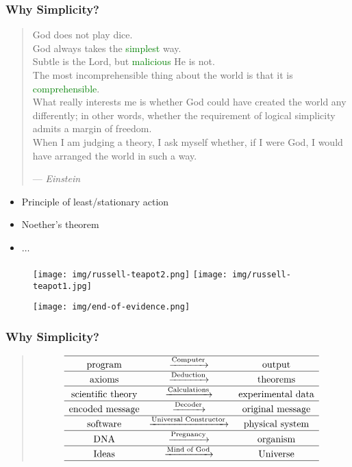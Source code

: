 \documentclass[UTF8,11pt,colorlinks,compress,openany]{beamer}%
\begin{document}
\begin{frame}\frametitle{Why Simplicity?}
	\begin{quote}
		God does not play dice.\\
		God always takes the \textcolor{green}{simplest} way.\\
		Subtle is the Lord, but \textcolor{green}{malicious} He is not.\\
		The most incomprehensible thing about the world is that it is \textcolor{green}{comprehensible}.\\
		What really interests me is whether God could have created the world any differently; in other words, whether the requirement of logical simplicity admits a margin of freedom.\\
		When I am judging a theory, I ask myself whether, if I were God, I would have arranged the
		world in such a way. \par\hfill --- \textsl{Einstein}
	\end{quote}
	\begin{itemize}
		\item Principle of least/stationary action
		\item Noether's theorem
		\item $\dots$
	\end{itemize}
\end{frame}

\begin{frame}\frametitle{}
\begin{figure}[H]
\texttt{[image: img/russell-teapot2.png]}
\texttt{[image: img/russell-teapot1.jpg]}
\end{figure}
\begin{figure}[H]
\texttt{[image: img/end-of-evidence.png]}
\end{figure}
\end{frame}

\begin{frame}\frametitle{Why Simplicity?}
	\begin{quote}
		\[\begin{array}{ccccc}
		\hline
		\text{program} & \xrightarrow{\text{Computer}} & \text{output}\\
		\hline
		\text{axioms} & \xrightarrow{\text{Deduction}} & \text{theorems}\\
		\hline
		\text{scientific theory} & \xrightarrow{\text{Calculations}} & \text{experimental data}\\
		\hline
		\text{encoded message} & \xrightarrow{\text{Decoder}} & \text{original message}\\
		\hline
		\text{software} & \xrightarrow{\text{Universal Constructor}} & \text{physical system}\\
		\hline
		\text{DNA} & \xrightarrow{\text{Pregnancy}} & \text{organism}\\
		\hline
		\text{Ideas} & \xrightarrow{\text{Mind of God}} & \text{Universe}\\
		\hline
		\end{array}\]
	\end{quote}
\end{frame}
\end{document}
